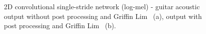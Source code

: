 \begin{figure}[htb!]
    \centering
    \captionsetup{justification=centering}
    \caption{2D convolutional single-stride network (log-mel) - guitar acoustic output without post processing and Griffin Lim ~(a), output with post processing and Griffin Lim ~(b).}
    \label{fig:apx_mel_single_gf}
\end{figure}

